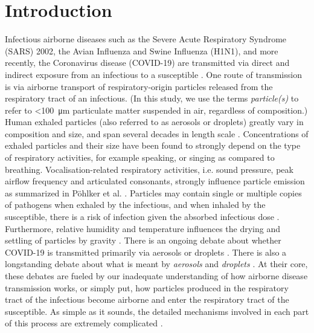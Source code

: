 \documentclass[preprint]{elsarticle}
\begin{document}
\section{Introduction}
Infectious airborne diseases such as the Severe Acute Respiratory Syndrome (SARS) 2002, the Avian Influenza and Swine Influenza (H1N1), and more recently, the Coronavirus disease (COVID-19) are transmitted via direct and indirect exposure from an infectious to a susceptible \cite{Zhang2020,WHO2020, Nordsiek2021, Pohlker2021}.
One route of transmission %
is via airborne transport of respiratory-origin particles released from the respiratory tract of an infectious. 
(In this study, we use the terms \emph{particle(s)} to refer to \textless\SI{100}{\micro\meter} particulate matter suspended in air, regardless of composition.)
Human exhaled particles (also referred to as aerosols or droplets) greatly vary in composition and size, and span several decades in length scale \cite[e.g. see][and references therein]{Nordsiek2021, Pohlker2021}.
Concentrations of exhaled particles and their size have been found to strongly depend on the type of respiratory activities, for example speaking, or singing as compared to breathing.
Vocalisation-related respiratory activities, i.e. sound pressure, peak airflow frequency and articulated consonants, strongly influence particle emission as summarized in P\"ohlker et al. \cite{Pohlker2021}.
Particles may contain single or multiple copies of pathogens when exhaled by the infectious, and when inhaled by the susceptible, there is a risk of infection given the absorbed infectious dose \cite{Nordsiek2021}.
Furthermore, relative humidity and temperature influences the drying and settling of particles by gravity \cite[see][and references therein]{Nordsiek2021, Pohlker2021}.
There is an ongoing debate about whether COVID-19 is transmitted primarily via aerosols or droplets \cite{GREENHALGH20211603, Leung2021}. There is also a longstanding debate about what is meant by \emph{aerosols} and \emph{droplets} \cite{randall2021did}.
At their core, these debates are fueled by our inadequate understanding of how airborne disease transmission works, or simply put, how particles produced in the respiratory tract of the infectious become airborne and enter the respiratory tract of the susceptible. As simple as it sounds, the detailed  mechanisms involved in each part of this process are extremely complicated \cite{Pohlker2021}. 
\end{document}
